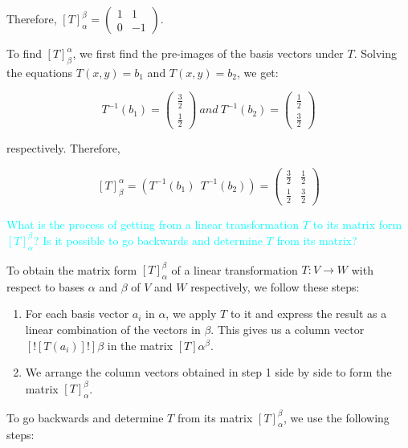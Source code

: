 \documentclass[fontsize=12pt]{scrartcl}
\begin{document}
Therefore, $\left[T\right]_{\alpha}^{\beta} = \begin{pmatrix} 1 & 1 \\ 0 & -1 \end{pmatrix}$.

To find $\left[T\right]_{\beta}^{\alpha}$, we first find the pre-images of the basis vectors under $T$. Solving the equations $T(x,y) = b_1$ and $T(x,y) = b_2$, we get:

$$T^{-1}(b_1) = \left(\begin{array}{c} \frac{3}{2} \\ \frac{1}{2} \end{array} \right)\ and \ T^{-1}(b_2) = \left(\begin{array}{c} \frac{1}{2} \\ \frac{3}{2} \end{array} \right)$$

respectively. Therefore,

$$\left[T\right]_{\beta}^{\alpha} = (T^{-1}(b_1) \ \ T^{-1}(b_2)) = \begin{pmatrix} \frac{3}{2} & \frac{1}{2} \\ \frac{1}{2} & \frac{3}{2} \end{pmatrix} $$

\noindent
\textcolor{cyan}{What is the process of getting from a linear transformation $T$ to its matrix form $\left[T\right]_{\alpha}^{\beta}$? Is it possible to go backwards and determine $T$ from its matrix?}

\noindent
To obtain the matrix form $\left[T\right]_{\alpha}^{\beta}$ of a linear transformation $T: V \to W$ with respect to bases $\alpha$ and $\beta$ of $V$ and $W$ respectively, we follow these steps:

\begin{enumerate}
	\item For each basis vector $a_i$ in $\alpha$, we apply $T$ to it and express the result as a linear combination of the vectors in $\beta$. This gives us a column vector $[![T(a_i)]!]{\beta}$ in the matrix $\left[T\right]{\alpha}^{\beta}$.
	\item We arrange the column vectors obtained in step 1 side by side to form the matrix $\left[T\right]_{\alpha}^{\beta}$.
\end{enumerate}

\noindent
To go backwards and determine $T$ from its matrix $\left[T\right]_{\alpha}^{\beta}$, we use the following steps:
\end{document}
